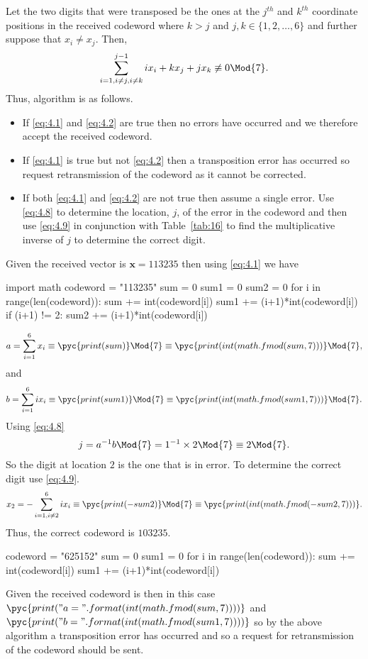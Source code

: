 Let the two digits that were transposed be the ones at the $j^{th}$ and $k^{th}$ coordinate positions in the received codeword where $k>j$ and $j,k \in \{1,2,\ldots,6\}$ and further suppose that $x_i \neq x_j$. Then,
\begin{align*}
	\sum_{i=1,i\neq j,i\neq k}^{j-1}ix_i + kx_j + jx_k \not\equiv 0 \Mod{7}.
\end{align*}
Thus, algorithm is as follows.
\begin{itemize}
	\item If \eqref{eq:4.1} and \eqref{eq:4.2} are true then no errors have occurred and we therefore accept the received codeword.
	\item If \eqref{eq:4.1} is true but not \eqref{eq:4.2} then a transposition error has occurred so request retransmission of the codeword as it cannot be corrected.
	\item If both \eqref{eq:4.1} and \eqref{eq:4.2} are not true then assume a single error. Use \eqref{eq:4.8} to determine the location, $j$, of the error in the codeword and then use \eqref{eq:4.9} in conjunction with Table~\ref{tab:16} to find the multiplicative inverse of $j$ to determine the correct digit.
\end{itemize}
\qsubpart
Given the received vector is $\bm{x} = 113235$ then using \eqref{eq:4.1} we have
\begin{pycode}
import math
codeword = "113235"
sum = 0
sum1 = 0
sum2 = 0
for i in range(len(codeword)):
	sum += int(codeword[i])
	sum1 += (i+1)*int(codeword[i])
	if (i+1) != 2:
		sum2 += (i+1)*int(codeword[i])
\end{pycode}
\begin{align*}
	a = \sum_{i=1}^{6} x_i \equiv \pyc{print(sum)} \Mod{7} \equiv \pyc{print(int(math.fmod(sum,7)))}  \Mod{7},
\end{align*}
and
\begin{align*}
	b = \sum_{i=1}^{6} ix_i \equiv \pyc{print(sum1)} \Mod{7} \equiv \pyc{print(int(math.fmod(sum1,7)))} \Mod{7}.
\end{align*}
Using \eqref{eq:4.8}
\begin{align*}
	j = a^{-1} b \Mod{7} = 1^{-1}\times 2 \Mod{7} \equiv 2 \Mod{7}.
\end{align*}
So the digit at location $2$ is the one that is in error. To determine the correct digit use \eqref{eq:4.9}.
\begin{align*}
	x_2 = -\sum_{i=1,i\neq 2}^{6} ix_i \equiv \pyc{print(-sum2)} \Mod{7} \equiv \pyc{print(int(math.fmod(-sum2,7)))}.
\end{align*}
Thus, the correct codeword is $103235$.
\begin{pycode}
codeword = "625152"
sum  = 0
sum1 = 0
for i in range(len(codeword)):
	sum += int(codeword[i])
	sum1 += (i+1)*int(codeword[i])
\end{pycode}
\qsubpart
Given the received codeword is  then in this case 
$\pyc{print("a={}".format(int(math.fmod(sum,7))))}$ and 
$\pyc{print("b={}".format(int(math.fmod(sum1,7))))}$ so by the above algorithm a transposition error has occurred and so a request for retransmission of the codeword should be sent.

